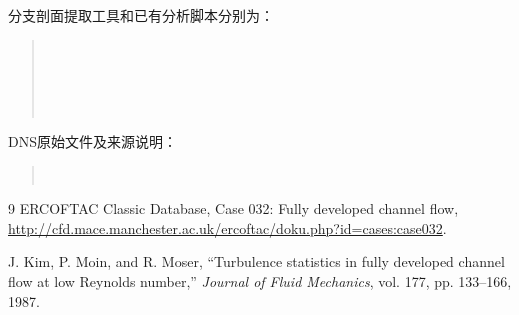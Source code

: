 \documentclass[UTF8,12pt,a4paper,fontset=fandol]{ctexart}
\begin{document}
分支剖面提取工具和已有分析脚本分别为：
\begin{quote}\small
{}\\
\\
\\
\\
\end{quote}

DNS原始文件及来源说明：
\begin{quote}\small
{}\\
\end{quote}

\begin{thebibliography}{9}
ERCOFTAC Classic Database, Case 032: Fully developed channel flow,
\url{http://cfd.mace.manchester.ac.uk/ercoftac/doku.php?id=cases:case032}.

J. Kim, P. Moin, and R. Moser,
``Turbulence statistics in fully developed channel flow at low Reynolds number,''
\emph{Journal of Fluid Mechanics}, vol. 177, pp. 133--166, 1987.
\end{thebibliography}
\end{document}
